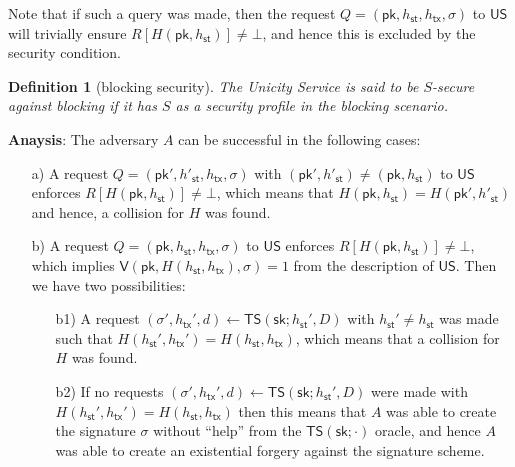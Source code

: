 \documentclass{article}
\newtheorem{definition}{Definition}[section]
\newcommand{\pubkey}[0]{\mathsf{pk}}
\newcommand{\prikey}[0]{\mathsf{sk}}
\newcommand{\sthash}[0]{h_\mathsf{st}}
\newcommand{\txhash}[0]{h_\mathsf{tx}}
\begin{document}
\noindent Note that if such a query was made, then the request $Q=(\pubkey,\sthash, \txhash,\sigma)$ to $\mathsf{US}$ will trivially ensure $R[H(\pubkey,h_\mathsf{st})]\neq\bot$, and hence this is excluded by the security condition. \medskip

\begin{definition}[blocking security]
The Unicity Service is said to be $S$-secure against blocking if it has $S$ as a security profile in the blocking scenario.
\end{definition}

\noindent\textbf{Anaysis}: The adversary $A$ can be successful in the following cases:
\begin{itemize}
\item[a)] A request $Q=(\pubkey', h'_\mathsf{st}, h_\mathsf{tx}, \sigma)$ with $(\pubkey',h'_\mathsf{st})\neq (\pubkey,h_\mathsf{st})$ to $\mathsf{US}$ enforces $R[H(\pubkey, h_\mathsf{st})]\neq\bot$, which means that  $H(\pubkey,h_\mathsf{st})=H(\pubkey', h'_\mathsf{st})$ and hence, a collision for $H$ was found.
\item[b)] A request $Q=(\pubkey, h_\mathsf{st}, h_\mathsf{tx}, \sigma)$ to $\mathsf{US}$ enforces $R[H(\pubkey, h_\mathsf{st})]\neq\bot$, which implies $\mathsf{V}(\pubkey, H(h_\mathsf{st},h_\mathsf{tx}), \sigma)=1$ from the description of $\mathsf{US}$. Then we have two possibilities:
\begin{itemize}
\item[b1)] A request $(\sigma',\txhash',d)\gets\mathsf{TS}(\prikey;\sthash',D)$ with $\sthash'\neq h_\mathsf{st}$ was made such that
$H(\sthash',\txhash')=H(\sthash,\txhash)$, which means that a collision for $H$ was found.
\item[b2)] If no requests $(\sigma',\txhash',d)\gets\mathsf{TS}(\prikey;\sthash',D)$ were made with $H(\sthash',\txhash')=H(\sthash,\txhash)$ then this means that $A$ was able to create the signature $\sigma$ without ``help'' from the $\mathsf{TS}(\prikey;\cdot)$ oracle, and hence $A$ was able to create an existential forgery against the signature scheme.
\end{itemize}
\end{itemize}
\end{document}
